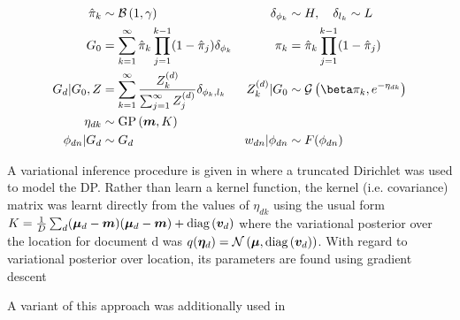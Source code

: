 \begin{align}
\hat{\pi}_k & \sim \mathcal{B}\left(1, \gamma\right) &
\delta_{\phi_k} & \sim H,\quad \delta_{l_k} \sim L \\
G_0 & = \sum_{k=1}^\infty \hat{\pi}_k \prod_{j=1}^{k-1} (1 - \hat{\pi}_j)\delta_{\phi_k} & 
\pi_k & = \hat{\pi}_k \prod_{j=1}^{k-1} (1 - \hat{\pi}_j) \\
G_d|G_0, Z & = \sum_{k=1}^\infty \frac{Z_k^{(d)}}{\sum_{j=1}^\infty Z_j^{(d)}} \delta_{\phi_k, l_k} &
Z_k^{(d)} | G_0 &\sim \gam{\beta \pi_k}{e^{-\eta_{dk}}} \\
\eta_{dk} & \sim \GP{\vv{m}}{K} \\
\phi_{dn} |G_d &\sim G_d & w_{dn} | \phi_{dn} & \sim F(\phi_{dn})
\end{align}

A variational inference procedure is given in \cite{Paisley2012b} where a truncated Dirichlet was used to model the DP. Rather than learn a kernel function, the kernel (i.e. covariance) matrix was learnt directly from the values of $\eta_{dk}$ using the usual form $K = \frac{1}{D} \sum_d (\bm \mu_d - \bm m)(\bm \mu_d - \bm m) + \text{diag} \left( {\bm v_d} \right)$ where the variational posterior over the location for document d was $q(\bm \eta_d) = \mathcal{N} \left( {\bm \mu}, {\text{diag} \left( {\bm v_d} \right)} \right)$. With regard to variational posterior over location, its parameters are found using gradient descent


A variant of this approach was additionally used in \cite{Virtanen2012a}





